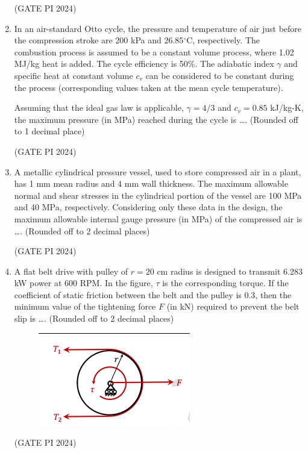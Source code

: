 \documentclass[journal,12pt,onecolumn]{IEEEtran}
\theoremstyle{remark}
\begin{document}
\begin{enumerate}
\hfill (GATE PI 2024)

\item In an air-standard Otto cycle, the pressure and temperature of air just before the compression stroke are 200 kPa and 26.85$^\circ$C, respectively. The combustion process is assumed to be a constant volume process, where 1.02 MJ/kg heat is added. The cycle efficiency is 50\%. The adiabatic index $\gamma$ and specific heat at constant volume $c_v$ can be considered to be constant during the process (corresponding values taken at the mean cycle temperature).

Assuming that the ideal gas law is applicable, $\gamma = 4/3$ and $c_v = 0.85$ kJ/kg-K, the maximum pressure (in MPa) reached during the cycle is \dots . (Rounded off to 1 decimal place)

\hfill (GATE PI 2024)

\item A metallic cylindrical pressure vessel, used to store compressed air in a plant, has 1 mm mean radius and 4 mm wall thickness. The maximum allowable normal and shear stresses in the cylindrical portion of the vessel are 100 MPa and 40 MPa, respectively. Considering only these data in the design, the maximum allowable internal gauge pressure (in MPa) of the compressed air is \dots . (Rounded off to 2 decimal places)

\hfill (GATE PI 2024)

\item A flat belt drive with pulley of $r = 20$ cm radius is designed to transmit 6.283 kW power at 600 RPM. In the figure, $\tau$ is the corresponding torque. If the coefficient of static friction between the belt and the pulley is $0.3$, then the minimum value of the tightening force $F$ (in kN) required to prevent the belt slip is \dots . (Rounded off to 2 decimal places)

\begin{figure}[H]
\centering
\includegraphics[width=0.5\columnwidth]{fig10.png}
\caption{}
\end{figure}

\hfill (GATE PI 2024)


\end{enumerate}
\end{document}
